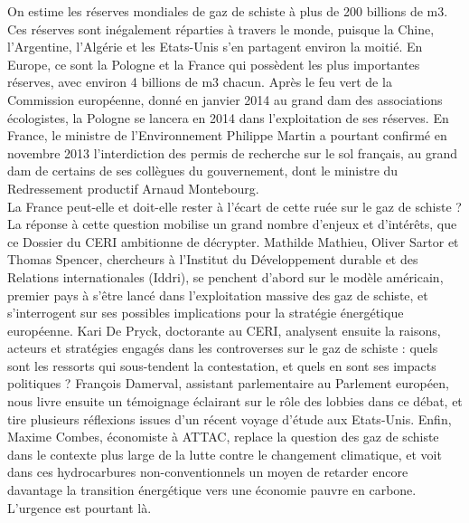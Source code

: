 \documentclass[8pt]{article}
\begin{document}
On estime les réserves mondiales de gaz de schiste à plus de 200 billions de m3. Ces réserves sont inégalement réparties à travers le monde, puisque la Chine, l’Argentine, l’Algérie et les Etats-Unis s’en partagent environ la moitié. En Europe, ce sont la Pologne et la France qui possèdent les plus importantes réserves, avec environ 4 billions de m3 chacun. Après le feu vert de la Commission européenne, donné en janvier 2014 au grand dam des associations écologistes, la Pologne se lancera en 2014 dans l’exploitation de ses réserves. En France, le ministre de l’Environnement Philippe Martin a pourtant confirmé en novembre 2013 l’interdiction des permis de recherche sur le sol français, au grand dam de certains de ses collègues du gouvernement, dont le ministre du Redressement productif Arnaud Montebourg.  \\

La France peut-elle et doit-elle rester à l’écart de cette ruée sur le gaz de schiste ? La réponse à cette question mobilise un grand nombre d’enjeux et d’intérêts, que ce Dossier du CERI ambitionne de décrypter. Mathilde Mathieu, Oliver Sartor et Thomas Spencer, chercheurs à l’Institut du Développement durable et des Relations internationales (Iddri), se penchent d’abord sur le modèle américain, premier pays à s’être lancé dans l’exploitation massive des gaz de schiste, et s’interrogent sur ses possibles implications pour la stratégie énergétique européenne. Kari De Pryck, doctorante au CERI, analysent ensuite la raisons, acteurs et stratégies engagés dans les controverses sur le gaz de schiste : quels sont les ressorts qui sous-tendent la contestation, et quels en sont ses impacts politiques ? François Damerval, assistant parlementaire au Parlement européen, nous livre ensuite un témoignage éclairant sur le rôle des lobbies dans ce débat, et tire plusieurs réflexions issues d’un récent voyage d’étude aux Etats-Unis. Enfin, Maxime Combes, économiste à ATTAC, replace la question des gaz de schiste dans le contexte plus large de la lutte contre le changement climatique, et voit dans ces hydrocarbures non-conventionnels un moyen de retarder encore davantage la transition énergétique vers une économie pauvre en carbone. L’urgence est pourtant là. 
\end{document}
